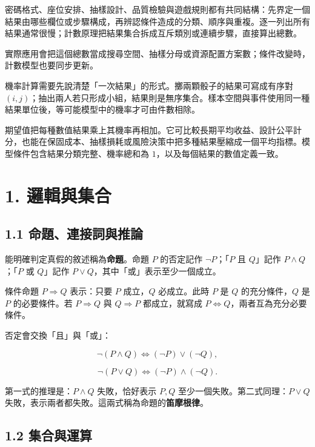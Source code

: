 \documentclass[11pt,a4paper]{article}
\begin{document}
密碼格式、座位安排、抽樣設計、品質檢驗與遊戲規則都有共同結構：先界定一個結果由哪些欄位或步驟構成，再辨認條件造成的分類、順序與重複。逐一列出所有結果通常很慢；計數原理把結果集合拆成互斥類別或連續步驟，直接算出總數。

實際應用會把這個總數當成搜尋空間、抽樣分母或資源配置方案數；條件改變時，計數模型也要同步更新。

機率計算需要先說清楚「一次結果」的形式。擲兩顆骰子的結果可寫成有序對 \((i,j)\)；抽出兩人若只形成小組，結果則是無序集合。樣本空間與事件使用同一種結果單位後，等可能模型中的機率才可由件數相除。

期望值把每種數值結果乘上其機率再相加。它可比較長期平均收益、設計公平計分，也能在保固成本、抽樣損耗或風險決策中把多種結果壓縮成一個平均指標。模型條件包含結果分類完整、機率總和為 \(1\)，以及每個結果的數值定義一致。

\section{1. 邏輯與集合}\label{ux908fux8f2fux8207ux96c6ux5408}

\subsection{1.1 命題、連接詞與推論}\label{ux547dux984cux9023ux63a5ux8a5eux8207ux63a8ux8ad6}

能明確判定真假的敘述稱為\textbf{命題}。命題 \(P\) 的否定記作 \(\neg P\)；「\(P\) 且 \(Q\)」記作 \(P\wedge Q\)；「\(P\) 或 \(Q\)」記作 \(P\vee Q\)，其中「或」表示至少一個成立。

條件命題 \(P\Rightarrow Q\) 表示：只要 \(P\) 成立，\(Q\) 必成立。此時 \(P\) 是 \(Q\) 的充分條件，\(Q\) 是 \(P\) 的必要條件。若 \(P\Rightarrow Q\) 與 \(Q\Rightarrow P\) 都成立，就寫成 \(P\Leftrightarrow Q\)，兩者互為充分必要條件。

否定會交換「且」與「或」：

\[
\neg(P\wedge Q)\Leftrightarrow(\neg P)\vee(\neg Q),
\]

\[
\neg(P\vee Q)\Leftrightarrow(\neg P)\wedge(\neg Q).
\]

第一式的推理是：\(P\wedge Q\) 失敗，恰好表示 \(P,Q\) 至少一個失敗。第二式同理：\(P\vee Q\) 失敗，表示兩者都失敗。這兩式稱為命題的\textbf{笛摩根律}。

\subsection{1.2 集合與運算}\label{ux96c6ux5408ux8207ux904bux7b97}
\end{document}
